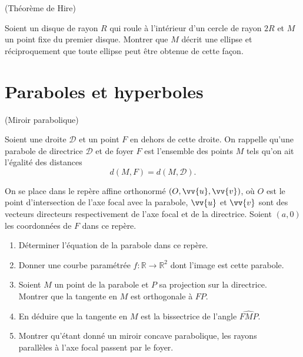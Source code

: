 \documentclass[a4paper,12pt,reqno]{amsart}
\begin{document}
\begin{exo} (Théorème de Hire)


  Soient un disque de rayon $R$ qui roule à l'intérieur d'un cercle de rayon $2R$ et $M$ un point fixe du premier disque. Montrer que $M$ décrit une ellipse et réciproquement que toute ellipse peut être obtenue de cette façon.

\end{exo}


\section{Paraboles et hyperboles}

\begin{exo} (Miroir parabolique)


  Soient une droite $\mathcal{D}$ et un point $F$ en dehors de cette droite. On rappelle qu'une parabole de directrice $\mathcal{D}$ et de foyer $F$ est l'ensemble des points $M$ tels qu'on ait l'égalité des distances
  $$
    d(M,F)= d(M,\mathcal{D}).
  $$


  On se place dans le repère affine orthonormé $(O,\vv{u},\vv{v})$, où $O$ est le point d'intersection de l'axe focal avec la parabole, $\vv{u}$ et $\vv{v}$ sont des vecteurs directeurs respectivement de l'axe focal et de la directrice. Soient $(a,0)$ les coordonnées de $F$ dans ce repère.

  \begin{enumerate}

    \item Déterminer l'équation de la parabole dans ce repère.

    \item Donner une courbe paramétrée $f:\mathbb{R}\to\mathbb{R}^{2}$ dont l'image est cette parabole.

    \item Soient $M$ un point de la parabole et $P$ sa projection sur la directrice.\\
    Montrer que la tangente en $M$ est orthogonale à $FP$.

    \item En déduire que la tangente en $M$ est la bissectrice de l'angle $\widehat{FMP}$.

    \item Montrer qu'étant donné un miroir concave parabolique, les rayons\\
    parallèles à l'axe focal passent par le foyer.
  \end{enumerate}

\end{exo}
\end{document}
